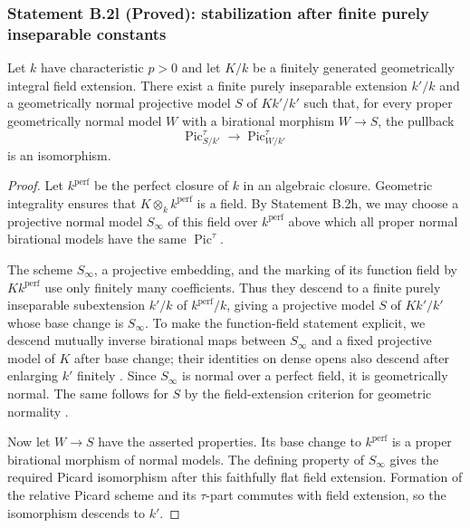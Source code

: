 \subsubsection*{Statement B.2l (Proved): stabilization after finite purely inseparable constants}
\begin{proposition}
\label{B:B2-finite-constants}
Let $k$ have characteristic $p>0$ and let $K/k$ be a finitely
generated geometrically integral field extension.  There exist a
finite purely inseparable extension $k'/k$ and a geometrically normal
projective model $S$ of $Kk'/k'$ such that, for every proper
geometrically normal model $W$ with a birational morphism $W\to S$,
the pullback
\[
 \operatorname{Pic}^{\tau}_{S/k'}\longrightarrow
 \operatorname{Pic}^{\tau}_{W/k'}
\]
is an isomorphism.
\end{proposition}
\begin{proof}
Let $k^{\mathrm{perf}}$ be the perfect closure of $k$ in an algebraic
closure.  Geometric integrality ensures that
$K\otimes_k k^{\mathrm{perf}}$ is a field.  By Statement B.2h,
we may choose a projective normal model $S_{\infty}$ of this field
over $k^{\mathrm{perf}}$ above which all proper normal birational
models have the same $\operatorname{Pic}^{\tau}$.

The scheme $S_{\infty}$, a projective embedding, and the marking
of its function field by $Kk^{\mathrm{perf}}$ use only finitely
many coefficients.  Thus they descend to a finite purely inseparable
subextension $k'/k$ of $k^{\mathrm{perf}}/k$, giving a projective
model $S$ of $Kk'/k'$ whose base change is $S_{\infty}$.
To make the function-field statement explicit, we descend mutually
inverse birational maps between $S_{\infty}$ and a fixed projective
model of $K$ after base change; their identities on dense opens
also descend after enlarging $k'$ finitely
\cite[Lemma 32.10.1, Tag 01ZM]{StacksB}.
Since $S_{\infty}$ is normal over a perfect field, it is
geometrically normal.  The same follows for $S$ by the field-extension
criterion for geometric normality
\cite[Lemmas 33.10.3--4, Tags 038O and 038P]{StacksB}.

Now let $W\to S$ have the asserted properties.  Its base change
to $k^{\mathrm{perf}}$ is a proper birational morphism of normal
models.  The defining property of $S_{\infty}$ gives the required
Picard isomorphism after this faithfully flat field extension.
Formation of the relative Picard scheme and its $\tau$-part commutes
with field extension, so the isomorphism descends to $k'$.
\end{proof}

